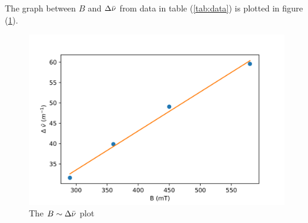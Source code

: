 \documentclass[%
 reprint,
nofootinbib,
 amsmath,amssymb,
 aps,
floatfix,
]{revtex4-2}
\begin{document}
    The graph between $B$ and $\Delta \Bar{\nu}$ from data in table (\ref{tab:data}) is plotted in figure (\ref{fig:plot-1}).
    \begin{figure}
        \centering
        \includegraphics[scale = 0.56]{Figures/plot-1.png}
        \caption{The $B \sim \Delta \Bar{\nu}$ plot}
        \label{fig:plot-1}
    \end{figure}
\end{document}
